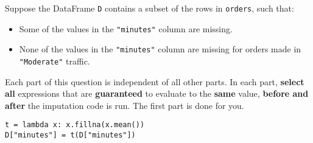 \documentclass[twoside,12pt]{article}
\begin{document}
\begin{probset}
\begin{prob}[(7 pts)]
    

\end{prob}

\newpage

\begin{prob}[(9 pts)]

Suppose the DataFrame \texttt{D} contains a subset of the rows in \texttt{orders}, such that:

\begin{itemize}
    \item Some of the values in the \texttt{"minutes"} column are missing.
    \item None of the values in the \texttt{"minutes"} column are missing for orders made in \texttt{"Moderate"} traffic.
\end{itemize}







Each part of this question is independent of all other parts. In each part, \textbf{select all} expressions that are \textbf{guaranteed} to evaluate to the \textbf{same} value, \textbf{before and after} the imputation code is run. The first part is done for you.

\begin{subprobset}

\begin{subprob}

\begin{verbatim}
t = lambda x: x.fillna(x.mean())
D["minutes"] = t(D["minutes"])
\end{verbatim}




\end{subprob}
\end{subprobset}
\end{prob}
\end{probset}
\end{document}
